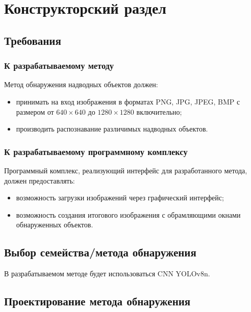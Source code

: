 \chapter{Конструкторский раздел}

\section{Требования}

\subsection*{К разрабатываемому методу}
Метод обнаружения надводных объектов должен:
\begin{itemize}[label=---]
    \item принимать на вход изображения в форматах PNG, JPG, JPEG, BMP с размером от $640 \times 640$ до $1280 \times 1280$ включительно;
    \item производить распознавание различимых надводных объектов.
\end{itemize}

\subsection*{К разрабатываемому программному комплексу}

Программный комплекс, реализующий интерфейс для разработанного метода, должен предоставлять:
\begin{itemize}[label=---]
    \item возможность загрузки изображений через графический интерфейс;
    \item возможность создания итогового изображения с обрамляющими окнами обнаруженных объектов.
\end{itemize}

\section{Выбор семейства/метода обнаружения}


В разрабатываемом методе будет использоваться CNN YOLOv8n.

\section{Проектирование метода обнаружения}


